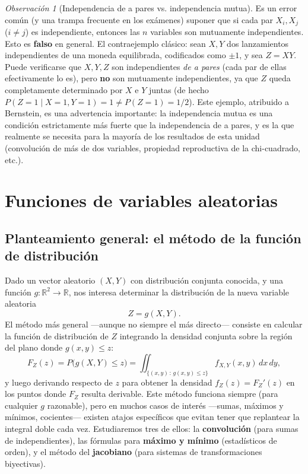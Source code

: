 \documentclass[11pt,a4paper]{article}
\theoremstyle{plain}
\theoremstyle{definition}
\theoremstyle{remark}
\newtheorem{observacion}[teorema]{Observación}
\begin{document}
\begin{observacion}[Independencia de a pares vs. independencia mutua]
Es un error común (y una trampa frecuente en los exámenes) suponer que si cada par $X_i,X_j$ ($i\ne j$) es independiente, entonces las $n$ variables son mutuamente independientes. Esto es \textbf{falso} en general. El contraejemplo clásico: sean $X,Y$ dos lanzamientos independientes de una moneda equilibrada, codificados como $\pm1$, y sea $Z=XY$. Puede verificarse que $X,Y,Z$ son independientes \emph{de a pares} (cada par de ellas efectivamente lo es), pero \textbf{no} son mutuamente independientes, ya que $Z$ queda completamente determinado por $X$ e $Y$ juntas (de hecho $P(Z=1\mid X=1,Y=1)=1\ne P(Z=1)=1/2$). Este ejemplo, atribuido a Bernstein, es una advertencia importante: la independencia mutua es una condición estrictamente más fuerte que la independencia de a pares, y es la que realmente se necesita para la mayoría de los resultados de esta unidad (convolución de más de dos variables, propiedad reproductiva de la chi-cuadrado, etc.).
\end{observacion}

\section{Funciones de variables aleatorias}\label{sec:funciones}

\subsection{Planteamiento general: el método de la función de distribución}

Dado un vector aleatorio $(X,Y)$ con distribución conjunta conocida, y una función $g:\mathbb R^2\to\mathbb R$, nos interesa determinar la distribución de la nueva variable aleatoria
\[
Z = g(X,Y).
\]
El método más general —aunque no siempre el más directo— consiste en calcular la función de distribución de $Z$ integrando la densidad conjunta sobre la región del plano donde $g(x,y)\le z$:
\[
F_Z(z) = P\big(g(X,Y)\le z\big) = \iint_{\{(x,y)\,:\,g(x,y)\le z\}} f_{X,Y}(x,y)\,dx\,dy,
\]
y luego derivando respecto de $z$ para obtener la densidad $f_Z(z)=F_Z'(z)$ en los puntos donde $F_Z$ resulta derivable. Este método funciona siempre (para cualquier $g$ razonable), pero en muchos casos de interés —sumas, máximos y mínimos, cocientes— existen atajos específicos que evitan tener que replantear la integral doble cada vez. Estudiaremos tres de ellos: la \textbf{convolución} (para sumas de independientes), las fórmulas para \textbf{máximo y mínimo} (estadísticos de orden), y el método del \textbf{jacobiano} (para sistemas de transformaciones biyectivas).
\end{document}
